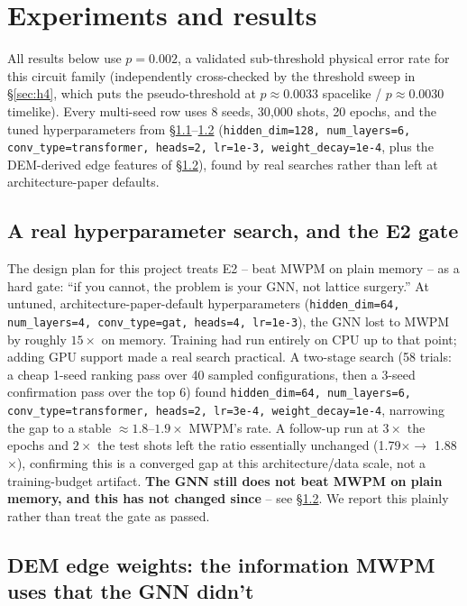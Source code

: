 \documentclass[11pt]{article}
\begin{document}
\section{Experiments and results}
\label{sec:results}

All results below use $p = 0.002$, a validated sub-threshold physical error
rate for this circuit family (independently cross-checked by the threshold
sweep in \S\ref{sec:h4}, which puts the pseudo-threshold at
$p \approx 0.0033$ spacelike / $p \approx 0.0030$ timelike). Every
multi-seed row uses 8 seeds, 30{,}000 shots, 20 epochs, and the tuned
hyperparameters from \S\ref{sec:hparam}--\ref{sec:edgefeat}
(\texttt{hidden\_dim=128, num\_layers=6, conv\_type=transformer, heads=2,
lr=1e-3, weight\_decay=1e-4}, plus the DEM-derived edge features of
\S\ref{sec:edgefeat}), found by real searches rather than left at
architecture-paper defaults.

\subsection{A real hyperparameter search, and the E2 gate}
\label{sec:hparam}

The design plan for this project treats E2 -- beat MWPM on plain memory -- as
a hard gate: ``if you cannot, the problem is your GNN, not lattice
surgery.'' At untuned, architecture-paper-default hyperparameters
(\texttt{hidden\_dim=64, num\_layers=4, conv\_type=gat, heads=4, lr=1e-3}),
the GNN lost to MWPM by roughly $15\times$ on memory. Training had run
entirely on CPU up to that point; adding GPU support made a real search
practical. A two-stage search (58 trials: a cheap 1-seed ranking pass over
40 sampled configurations, then a 3-seed confirmation pass over the top 6)
found \texttt{hidden\_dim=64, num\_layers=6, conv\_type=transformer,
heads=2, lr=3e-4, weight\_decay=1e-4}, narrowing the gap to a stable
$\approx 1.8$--$1.9\times$ MWPM's rate. A follow-up run at $3\times$ the
epochs and $2\times$ the test shots left the ratio essentially unchanged
(1.79$\times \to$ 1.88$\times$), confirming this is a converged gap at this
architecture/data scale, not a training-budget artifact. \textbf{The GNN
still does not beat MWPM on plain memory, and this has not changed since} --
see \S\ref{sec:edgefeat}. We report this plainly rather than treat the gate
as passed.

\subsection{DEM edge weights: the information MWPM uses that the GNN didn't}
\label{sec:edgefeat}
\end{document}
